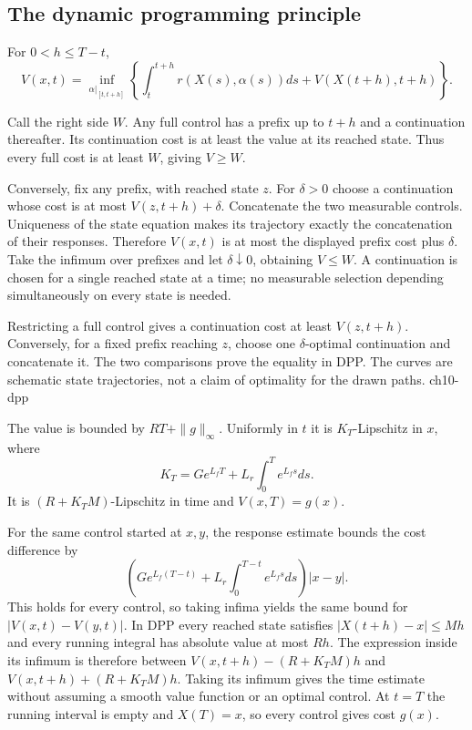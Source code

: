 \Needspace{70mm}
\subsection{The dynamic programming principle}
\Needspace{55mm}
\begin{theorem}
For $0<h\leq T-t$,
\begin{equation}\label{eq:10-dpp}
 V(x,t)=\inf_{\alpha|_{[t,t+h]}}
 \left\{\int_t^{t+h}r(X(s),\alpha(s))ds+V(X(t+h),t+h)\right\}.
\end{equation}
\end{theorem}
\begin{expandedproof}
Call the right side $W$. Any full control has a prefix up to $t+h$
and a continuation thereafter. Its continuation cost is at least the value
at its reached state. Thus every full cost is at least $W$, giving $V\geq W$.

Conversely, fix any prefix, with reached state $z$. For $\delta>0$
choose a continuation whose cost is at most $V(z,t+h)+\delta$.
Concatenate the two measurable controls. Uniqueness of the state equation
makes its trajectory exactly the concatenation of their responses.
Therefore $V(x,t)$ is at most the displayed prefix cost plus $\delta$.
Take the infimum over prefixes and let $\delta\downarrow0$, obtaining
$V\leq W$. A continuation is chosen for a single reached state at a time;
no measurable selection depending simultaneously on every state is needed.
\end{expandedproof}
{Restricting a full control gives a continuation cost at least $V(z,t+h)$. Conversely, for a fixed prefix reaching $z$, choose one $\delta$-optimal continuation and concatenate it. The two comparisons prove the equality in DPP. The curves are schematic state trajectories, not a claim of optimality for the drawn paths.}
{ch10-dpp}
\Needspace{50mm}
\begin{lemma}
The value is bounded by $RT+\|g\|_\infty$. Uniformly in $t$ it is
$K_T$-Lipschitz in $x$, where
\[
 K_T=Ge^{L_fT}+L_r\int_0^T e^{L_fs}ds.
\]
It is $(R+K_TM)$-Lipschitz in time and $V(x,T)=g(x)$.
\end{lemma}
\begin{expandedproof}
For the same control started at $x,y$, the response estimate bounds the
cost difference by
\[
 \left(G e^{L_f(T-t)}+L_r\int_0^{T-t}e^{L_fs}ds\right)|x-y|.
\]
This holds for every control, so taking infima yields the same bound
for $|V(x,t)-V(y,t)|$. In DPP every reached state satisfies
$|X(t+h)-x|\leq Mh$ and every running integral has absolute value
at most $Rh$. The expression inside its infimum is therefore between
$V(x,t+h)-(R+K_TM)h$ and $V(x,t+h)+(R+K_TM)h$.
Taking its infimum gives the time estimate without assuming a smooth
value function or an optimal control. At $t=T$ the running interval is
empty and $X(T)=x$, so every control gives cost $g(x)$.
\end{expandedproof}
